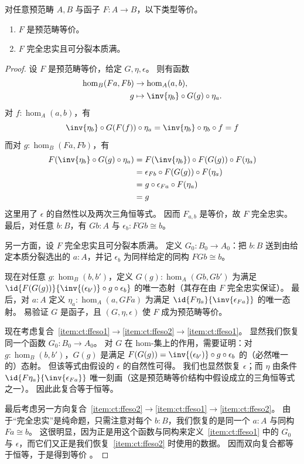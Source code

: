 \begin{lem}\label{ct:ffeso}
  对任意预范畴 $A,B$ 与函子 $F:A\to B$，以下类型等价。
  \begin{enumerate}
  \item $F$ 是预范畴等价。\label{item:ct:ffeso1}
  \item $F$ 完全忠实且可分裂本质满。\label{item:ct:ffeso2}
  \end{enumerate}
\end{lem}
\begin{proof}
  设 $F$ 是预范畴等价，给定 $G,\eta,\epsilon$。
  则有函数
  \begin{align*}
      \hom_B(Fa,Fb) &\to \hom_A(a,b),\\
      g &\mapsto \inv{\eta_b}\circ G(g)\circ \eta_a.
  \end{align*}
  对 $f:\hom_A(a,b)$，有
  \[ \inv{\eta_{b}}\circ G(F(f))\circ \eta_{a}  =
  \inv{\eta_{b}} \circ \eta_{b} \circ f=
  f
  \]
  而对 $g:\hom_B(Fa,Fb)$，有
  \begin{align*}
    F(\inv{\eta_b} \circ G(g)\circ\eta_a)
    &= F(\inv{\eta_b})\circ F(G(g))\circ F(\eta_a)\\
    &= \epsilon_{Fb}\circ F(G(g))\circ F(\eta_a)\\
    &= g\circ\epsilon_{Fa}\circ F(\eta_a)\\
    &= g
  \end{align*}
  这里用了 $\epsilon$ 的自然性以及两次三角恒等式。
  因而 $F_{a,b}$ 是等价，故 $F$ 完全忠实。
  最后，对任意 $b:B$，有 $Gb:A$ 与 $\epsilon_b:FGb\cong b$。

  另一方面，设 $F$ 完全忠实且可分裂本质满。
  定义 $G_0:B_0\to A_0$：把 $b:B$ 送到由给定本质分裂选出的 $a:A$，并记 $\epsilon_b$ 为同样给定的同构 $FGb\cong b$。

  现在对任意 $g:\hom_B(b,b')$，定义 $G(g):\hom_A(Gb,Gb')$ 为满足
  $\id{F(G(g))}{\inv{(\epsilon_{b'})}\circ g \circ \epsilon_b }$
  的唯一态射（其存在由 $F$ 完全忠实保证）。
  最后，对 $a:A$ 定义 $\eta_a:\hom_A(a,GFa)$ 为满足
  $\id{F\eta_a}{\inv{\epsilon_{Fa}}}$
  的唯一态射。
  易验证 $G$ 是函子，且 $(G,\eta,\epsilon)$ 使 $F$ 成为预范畴等价。

  现在考虑复合~\ref{item:ct:ffeso1}$\to$\ref{item:ct:ffeso2}$\to$\ref{item:ct:ffeso1}。
  显然我们恢复同一个函数 $G_0:B_0 \to A_0$。
  对 $G$ 在 hom-集上的作用，需要证明：对 $g:\hom_B(b,b')$，$G(g)$ 是满足 $F(G(g)) = \inv{(\epsilon_{b'})}\circ g \circ \epsilon_b$ 的（必然唯一的）态射。
  但该等式由假设的 $\epsilon$ 的自然性可得。
  我们也显然恢复 $\epsilon$；而 $\eta$ 由条件 $\id{F\eta_a}{\inv{\epsilon_{Fa}}}$ 唯一刻画（这是预范畴等价结构中假设成立的三角恒等式之一）。
  因此此复合等于恒等。

  最后考虑另一方向复合~\ref{item:ct:ffeso2}$\to$\ref{item:ct:ffeso1}$\to$\ref{item:ct:ffeso2}。
  由于“完全忠实”是纯命题，只需注意对每个 $b:B$，我们恢复的是同一个 $a:A$ 与同构 $F a \cong b$。
  这很明显，因为正是用这个函数与同构来定义~\ref{item:ct:ffeso1} 中的 $G_0$ 与 $\epsilon$，而它们又正是我们恢复~\ref{item:ct:ffeso2} 时使用的数据。
  因而双向复合都等于恒等，于是得到等价 \eqv{\text{\ref{item:ct:ffeso1}}}{\text{\ref{item:ct:ffeso2}}}。
\end{proof}

